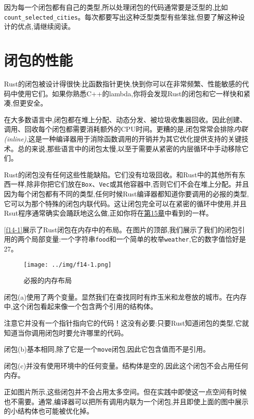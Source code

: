 因为每一个闭包都有自己的类型,所以处理闭包的代码通常要是泛型的,比如\texttt{count\_selected\_cities}。每次都要写出这种泛型类型有些笨拙,但要了解这种设计的优点,请继续阅读。

\section{闭包的性能}

Rust的闭包被设计得很快:比函数指针更快,快到你可以在非常频繁、性能敏感的代码中使用它们。如果你熟悉C++的lambda,你将会发现Rust的闭包和它一样快和紧凑,但更安全。

在大多数语言中,闭包都在堆上分配、动态分发、被垃圾收集器回收。因此创建、调用、回收每个闭包都需要消耗额外的CPU时间。更糟的是,闭包常常会排除\emph{内联(inline)},这是一种编译器用于消除函数调用的开销并为其它优化提供支持的关键技术。总的来说,那些语言中的闭包太慢,以至于需要从紧密的内层循环中手动移除它们。

Rust的闭包没有任何这些性能缺陷。它们没有垃圾回收。和Rust中的其他所有东西一样,除非你把它们放在\texttt{Box}、\texttt{Vec}或其他容器中,否则它们不会在堆上分配。并且因为每个闭包都有不同的类型,任何时候Rust编译器都知道你要调用的必报的类型,它可以为那个特殊的闭包内联代码。这让闭包完全可以在紧密的循环中使用,并且Rsut程序通常确实会踊跃地这么做,正如你将在\hyperref[ch15]{第15章}中看到的一样。

\autoref{f14-1}展示了Rust闭包在内存中的布局。在图片的顶部,我们展示了我们的闭包引用的两个局部变量:一个字符串\texttt{food}和一个简单的枚举\texttt{weather},它的数字值恰好是27。

\begin{figure}[htbp]
    \centering
    \texttt{[image: ../img/f14-1.png]}
    \caption{必报的内存布局}
    \label{f14-1}
\end{figure}

闭包(a)使用了两个变量。显然我们在查找同时有炸玉米和龙卷放的城市。在内存中,这个闭包看起来像一个包含两个引用的结构体。

注意它并没有一个指针指向它的代码！这没有必要:只要Rust知道闭包的类型,它就知道当你调用闭包时要允许哪里的代码。

闭包(b)基本相同,除了它是一个\texttt{move}闭包,因此它包含值而不是引用。

闭包(c)并没有使用环境中的任何变量。结构体是空的,因此这个闭包不会占用任何内存。

正如图片所示,这些闭包并不会占用太多空间。但在实践中即使这一点空间有时候也不需要。通常,编译器可以把所有调用内联为一个闭包,并且即使上面的图中展示的小结构体也可能被优化掉。

